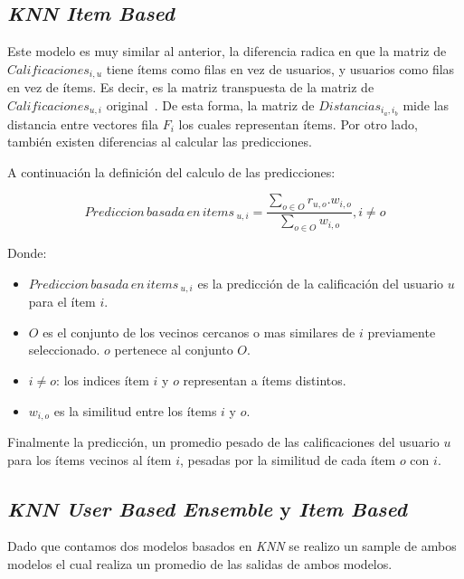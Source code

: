 \documentclass[11pt,a4paper,twoside]{thesis}
\begin{document}
\subsection{\textit{KNN Item Based}}

Este modelo es muy similar al anterior, la diferencia radica en que la matriz
de $Calificaciones_{i, u}$ tiene ítems como filas en vez de usuarios, y
usuarios como filas en vez de ítems. Es decir, es la matriz transpuesta de la
matriz de $Calificaciones_{u, i}$ original~\cite{useritembasedinference}. De
esta forma, la matriz de $Distancias_{i_a,i_b}$ mide las distancia entre
vectores fila $F_i$ los cuales representan ítems. Por otro lado, también
existen diferencias al calcular las predicciones.

A continuación la definición del calculo de las predicciones:

\begin{equation}
	Prediccion \mspace{3mu}basada \mspace{3mu}en \mspace{3mu}items\mspace{3mu}_{u, i} = \frac{\sum_{o \in O} r_{u, o}. w_{i, o} }{\sum_{o \in O} w_{i, o} }, i \neq o
\end{equation}
\begin{description}
	\item[Donde:]
\end{description}
\begin{itemize}
	\item $Prediccion \mspace{3mu}basada \mspace{3mu}en \mspace{3mu}items\mspace{3mu}_{u, i}$ es la predicción de la calificación del usuario $u$ para el ítem $i$.
	\item $O$ es el conjunto de los vecinos cercanos o mas similares de $i$ previamente seleccionado. $o$ pertenece al conjunto $O$.
	\item $i \neq o$: los indices ítem $i$ y $o$ representan a ítems distintos.
	\item $w_{i,o}$ es la similitud entre los ítems $i$ y $o$.
\end{itemize}

Finalmente la predicción, un promedio pesado de las calificaciones del usuario
$u$ para los ítems vecinos al ítem $i$, pesadas por la similitud de cada ítem
$o$ con $i$.

\subsection{\textit{KNN User Based Ensemble} y \textit{Item Based}}

Dado que contamos dos modelos basados en \textit{KNN} se realizo un sample de
ambos modelos el cual realiza un promedio de las salidas de ambos modelos.
\end{document}
